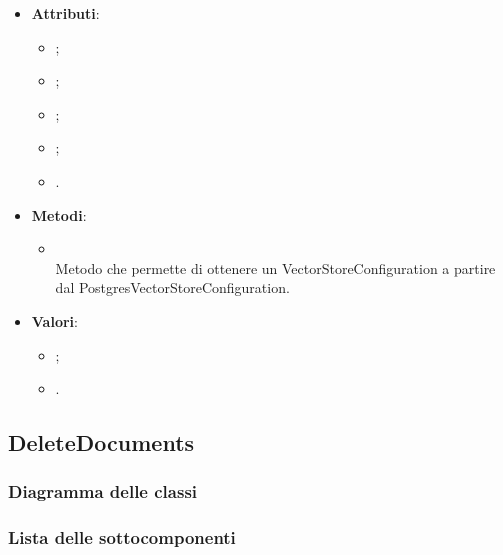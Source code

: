 \documentclass[10pt, a4paper]{article}
\begin{document}
\label{PostgresVectorStoreConfigurationDettaglio}
\begin{itemize}
    \item \textbf{Attributi}:
    \begin{itemize}
        \item {};
        \item {};
        \item {};
        \item {};
        \item {}.  
    \end{itemize}
    \item \textbf{Metodi}:
    \begin{itemize}
        \item {}\\ 
        Metodo che permette di ottenere un VectorStoreConfiguration a partire dal PostgresVectorStoreConfiguration.
    \end{itemize}
\end{itemize}

\label{PostgresVectorStoreTypeDettaglio}
\begin{itemize}
    \item \textbf{Valori}:
    \begin{itemize}
        \item {};
        \item {}. 
    \end{itemize}
\end{itemize}



\subsection{DeleteDocuments}
\subsubsection{Diagramma delle classi}
\subsubsection{Lista delle sottocomponenti}
\end{document}

